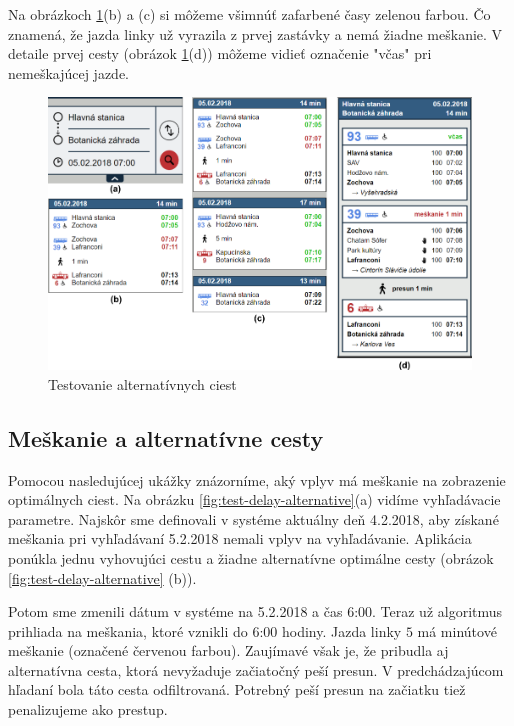 Na obrázkoch \ref{fig:test-alternative}(b) a (c) si môžeme všimnúť zafarbené časy zelenou farbou. Čo znamená, že jazda linky už vyrazila z prvej zastávky a nemá žiadne meškanie. V detaile prvej cesty (obrázok \ref{fig:test-alternative}(d)) môžeme vidieť označenie "včas"  pri nemeškajúcej jazde.

\begin{figure}[H]
\centerline{\includegraphics[width=1.0\textwidth]{images/test/alternative}}
\caption[Testovanie alternatívnych ciest]{Testovanie alternatívnych ciest}
\label{fig:test-alternative}
\end{figure}

\subsection{Meškanie a alternatívne cesty}
Pomocou nasledujúcej ukážky znázorníme, aký vplyv má meškanie na zobrazenie optimálnych ciest. Na obrázku \ref{fig:test-delay-alternative}(a) vidíme vyhľadávacie parametre. Najskôr sme definovali v systéme aktuálny deň 4.2.2018, aby získané meškania pri vyhľadávaní 5.2.2018 nemali vplyv na vyhľadávanie. Aplikácia ponúkla jednu vyhovujúci cestu a žiadne alternatívne optimálne cesty (obrázok \ref{fig:test-delay-alternative} (b)). 

Potom sme zmenili dátum v systéme na 5.2.2018 a čas 6:00. Teraz už algoritmus prihliada na meškania, ktoré vznikli do 6:00 hodiny. Jazda linky $5$ má minútové meškanie (označené červenou farbou). Zaujímavé však je, že pribudla aj alternatívna cesta, ktorá nevyžaduje začiatočný peší presun. V predchádzajúcom hľadaní bola táto cesta odfiltrovaná. Potrebný peší presun na začiatku tiež penalizujeme ako prestup. 
 
